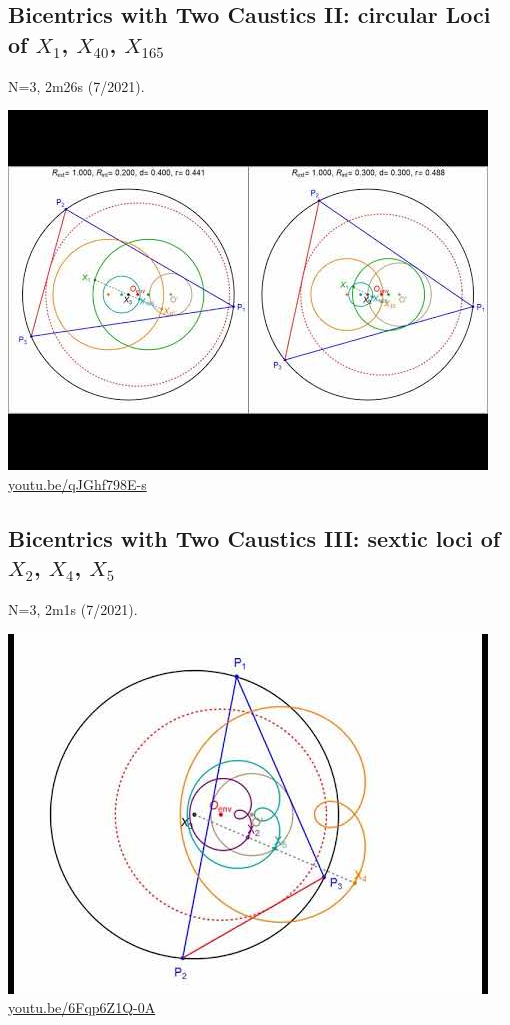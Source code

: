 \documentclass[12pt]{amsart}
\begin{document}
\subsection{Bicentrics with Two Caustics II: circular Loci of $X_{1}$, $X_{40}$, $X_{165}$}
\label{vid:qJGhf798E-s}
\noindent N=3, 2m26s (7/2021). 
\begin{center}\includegraphics[width=.5\textwidth]{pics/qJGhf798E-s.jpg} \\ 
\href{https://youtu.be/qJGhf798E-s}{\url{youtu.be/qJGhf798E-s}}\end{center}
% 

\subsection{Bicentrics with Two Caustics III: sextic loci of $X_{2}$, $X_{4}$, $X_{5}$}
\label{vid:6Fqp6Z1Q-0A}
\noindent N=3, 2m1s (7/2021). 
\begin{center}\includegraphics[width=.5\textwidth]{pics/6Fqp6Z1Q-0A.jpg} \\ 
\href{https://youtu.be/6Fqp6Z1Q-0A}{\url{youtu.be/6Fqp6Z1Q-0A}}\end{center}
% 
\end{document}
